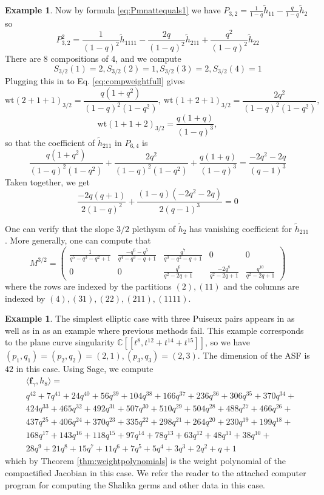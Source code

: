 \documentclass{amsart}
\numberwithin{equation}{section}
\theoremstyle{definition}
\newtheorem{example}[lemma]{Example}%
\def\tilde{\widetilde}
\renewcommand{\th}{\tilde{h}}
\newcommand{\wt}{\mathrm{wt}}
\newcommand{\fgamma}{\mathbf{f}_{\gamma}}
\newcommand{\C}{{\mathbb C}}
\begin{document}
\begin{example}
Now by formula \eqref{eq:Pmnattequals1} we have
$P_{3,2}=\frac{1}{1-q}\th_{11}-\frac{q}{1-q}\th_{2}
$ so $$P_{3,2}^2=\frac{1}{(1-q)^2}\th_{1111}-\frac{2q}{(1-q)^2}\th_{211}+\frac{q^2}{(1-q)^2}\th_{22}$$
There are $8$ compositions of $4$, and we compute 
$$S_{3/2}(1)=2,S_{3/2}(2)=1,S_{3/2}(3)=2,S_{3/2}(4)=1$$
Plugging this in to Eq. \eqref{eq:compweightfull} gives
$$
\wt(2+1+1)_{3/2}=\frac{q(1+q^2)}{(1-q)^2(1-q^2)},\ \wt(1+2+1)_{3/2}=\frac{2q^2}{(1-q)^2(1-q^2)},\ $$$$ \wt(1+1+2)_{3/2}=\frac{q(1+q)}{(1-q)^3},
$$
so that the coefficient of $\th_{211}$
in $P_{6,4}$ is $$\frac{q(1+q^2)}{(1-q)^2(1-q^2)}+\frac{2q^2}{(1-q)^2(1-q^2)}+\frac{q(1+q)}{(1-q)^3}=\frac{-2q^2 - 2q}{(q- 1)^3}$$
Taken together, we get 
$$\frac{-2q(q+1)}{2(1-q)^2}+\frac{(1-q)(-2q^2 - 2q)}{2(q- 1)^3}=0$$

One can verify that the slope $3/2$ plethysm of $\th_2$ has vanishing coefficient for $\th_{211}$. More generally, one can compute that
$$M^{3/2}=\left(\begin{array}{rrrrr}
\frac{1}{q^{5} - q^{3} - q^{2} + 1} & \frac{-q^{6} - q^{5}}{q^{4} - q^{3} - q + 1} & \frac{q^{7}}{q^{3} - q^{2} - q + 1} & 0 & 0 \\
0 & 0 & \frac{q^{6}}{q^{2} - 2 q + 1} & \frac{-2 q^{8}}{q^{2} - 2 q + 1} & \frac{q^{10}}{q^{2} - 2 q + 1}
\end{array}\right)$$
where the rows are indexed by the partitions $(2),(11)$ and the columns are indexed by $(4),(31),(22),(211),(1111)$.

\end{example}
\begin{example}
The simplest elliptic case with three Puiseux pairs appears in \cite[Eq. (3.8.)]{CD} as well as in \cite{Piontkowski} as an example where previous methods fail. 
This example corresponds to the plane curve singularity $\C[[t^8, t^{12}+t^{14}+t^{15}]]$, so we have
$(p_1,q_1)=(p_2,q_2)=(2,1), (p_3,q_3)=(2,3)$. The dimension of the ASF is $42$ in this case. Using Sage, we compute 
\begin{eqnarray*}
&\langle \fgamma,h_8\rangle=\\
&q^{42} + 7 q^{41} + 24 q^{40} + 56 q^{39} + 104 q^{38} + 166 q^{37} + 236 q^{36} + 306 q^{35} + 370 q^{34} +\\
&424 q^{33} + 465 q^{32} + 492 q^{31} + 507 q^{30} + 510 q^{29} + 504 q^{28} + 488 q^{27} + 466 q^{26} + \\
&437 q^{25} + 406 q^{24} + 370 q^{23} + 335 q^{22} + 298 q^{21} + 264 q^{20} + 230 q^{19} + 199 q^{18} + \\
&168 q^{17} + 143 q^{16} + 118 q^{15} + 97 q^{14} + 78 q^{13} + 63 q^{12} + 48 q^{11} + 38 q^{10} + \\
&28 q^{9} + 21 q^{8} + 15 q^{7} + 11 q^{6} + 7 q^{5} + 5 q^{4} + 3 q^{3} + 2 q^{2} + q + 1
\end{eqnarray*}
which by Theorem \ref{thm:weightpolynomials} is the weight polynomial of the compactified Jacobian in this case. We refer the reader to the attached computer program for computing the Shalika germs and other data in this case.
\end{example}
\end{document}

